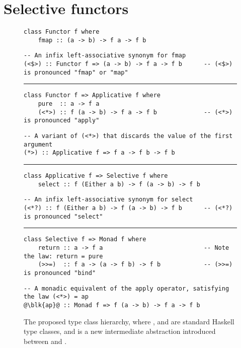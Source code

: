\section{Selective functors}\label{sec-selective}

\begin{figure}
\begin{verbatim}
class Functor f where
    fmap :: (a -> b) -> f a -> f b
\end{verbatim}
\vspace{1mm}
\begin{verbatim}
-- An infix left-associative synonym for fmap
(<$>) :: Functor f => (a -> b) -> f a -> f b      -- (<$>) is pronounced "fmap" or "map"
\end{verbatim}
\vspace{2mm}
\hrule
\vspace{2mm}
\begin{verbatim}
class Functor f => Applicative f where
    pure  :: a -> f a
    (<*>) :: f (a -> b) -> f a -> f b             -- (<*>) is pronounced "apply"
\end{verbatim}
\vspace{1mm}
\begin{verbatim}
-- A variant of (<*>) that discards the value of the first argument
(*>) :: Applicative f => f a -> f b -> f b
\end{verbatim}
\vspace{2mm}
\hrule
\vspace{2mm}
\begin{verbatim}
class Applicative f => Selective f where
    select :: f (Either a b) -> f (a -> b) -> f b
\end{verbatim}
\vspace{1mm}
\begin{verbatim}
-- An infix left-associative synonym for select
(<*?) :: f (Either a b) -> f (a -> b) -> f b      -- (<*?) is pronounced "select"
\end{verbatim}
\vspace{2mm}
\hrule
\vspace{2mm}
\begin{verbatim}
class Selective f => Monad f where
    return :: a -> f a                            -- Note the law: return = pure
    (>>=)  :: f a -> (a -> f b) -> f b            -- (>>=) is pronounced "bind"
\end{verbatim}
\vspace{1mm}
\begin{verbatim}
-- A monadic equivalent of the apply operator, satisfying the law (<*>) = ap
@\blk{ap}@ :: Monad f => f (a -> b) -> f a -> f b
\end{verbatim}
\caption{The proposed type class hierarchy, where , 
and  are standard Haskell type classes, and  is
a new intermediate abstraction introduced between  and
.}\label{fig-types}
\end{figure}

